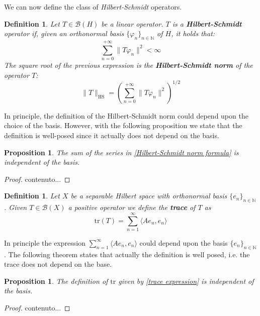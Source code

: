 \documentclass[corpo=11pt, stile=classica, tipotesi=custom,
greek, evenboxes, english]{toptesi}
\numberwithin{equation}{chapter}
\newtheorem{defi}[teo]{Definition}
\newtheorem{prop}[teo]{Proposition}
\theoremstyle{remark}
\newcommand{\N}{\mathbb{N}} %
\newcommand{\B}{\mathscr{B}} %
\begin{document}
We can now define the class of \emph{Hilbert-Schmidt} operators.
\begin{defi}\label{Hilbert-Schmidt operator definition}
	Let $T \in \B(H)$ be a linear operator. $T$ is a \textbf{Hilbert-Schmidt} operator if, given an orthonormal basis $\{\varphi_n\}_{n \in \N}$ of $H$, it holds that:
	\begin{equation}\label{Hilbert-Schmidt operator condition}
		\sum_{n=0}^{+\infty} \|T \varphi_n \|^2 < \infty
	\end{equation}
	The square root of the previous expression is the \textbf{Hilbert-Schmidt norm} of the operator $T$:
	\begin{equation}\label{Hilbert-Schmidt norm formula}
		\|T\|_{\mathrm{HS}} = \left( \sum_{n=0}^{+\infty} \|T \varphi_n \|^2 \right)^{1/2}
	\end{equation}
\end{defi}
In principle, the definition of the Hilbert-Schmidt norm could depend upon the choice of the basis. However, with the following proposition we state that the definition is well-posed since it actually does not depend on the basis.
\begin{prop}\label{Hilbert-Schmidt norm is well-defined}
	The sum of the series in \eqref{Hilbert-Schmidt norm formula} is independent of the basis.
\end{prop}
\begin{proof}
	contenuto...
\end{proof}

\begin{defi}\label{trace def}
	Let $X$ be a separable Hilbert space with orthonormal basis $\{e_n\}_{n \in \N}$. Given $T \in \B(X)$ a positive operator we define the \textbf{trace} of $T$ as
	\begin{equation*}\label{trace expression}
		\mathrm{tr}(T) = \sum_{n=1}^{\infty} \langle A e_n, e_n \rangle
	\end{equation*}
\end{defi}
In principle the expression $\sum_{n=1}^{\infty} \langle A e_n, e_n \rangle$ could depend upon the basis $\{e_n\}_{n \in \N}$. The following theorem states that actually the definition is well posed, i.e. the trace does not depend on the base.
\begin{prop}\label{trace is well-deefined}
	The definition of $\mathrm{tr}$ given by \eqref{trace expression} is independent of the basis.
\end{prop}
\begin{proof}
	contenuto...
\end{proof}
\end{document}
